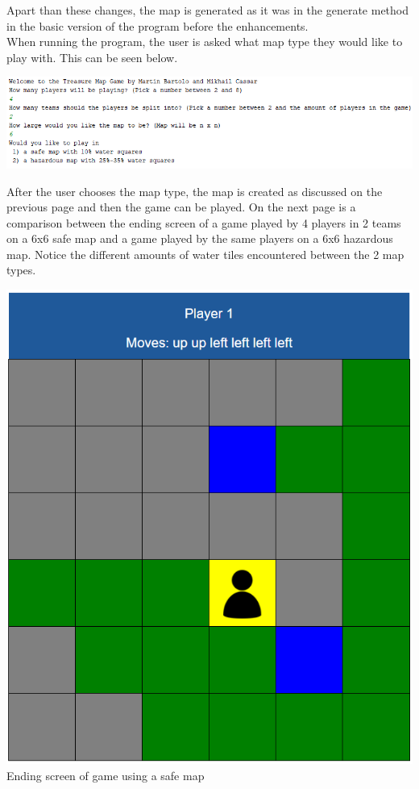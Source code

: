 \documentclass[a4paper,12pt]{extarticle}
\begin{document}
\noindent Apart than these changes, the map is generated as it was in the generate method in the basic version of the program before the enhancements.\\

\noindent When running the program, the user is asked what map type they would like to play with. This can be seen below.

\begin{center}
\includegraphics[width=\textwidth]{Figure1.png}
\end{center}

\noindent After the user chooses the map type, the map is created as discussed on the previous page and then the game can be played. On the next page is a comparison between the ending screen of a game played by 4 players in 2 teams on a 6x6 safe map and a game played by the same players on a 6x6 hazardous map. Notice the different amounts of water tiles encountered between the 2 map types.
\newpage

\begin{center}
\includegraphics[scale=0.5]{Figure2.png}\\
Ending screen of game using a safe map
\end{center}
\end{document}
